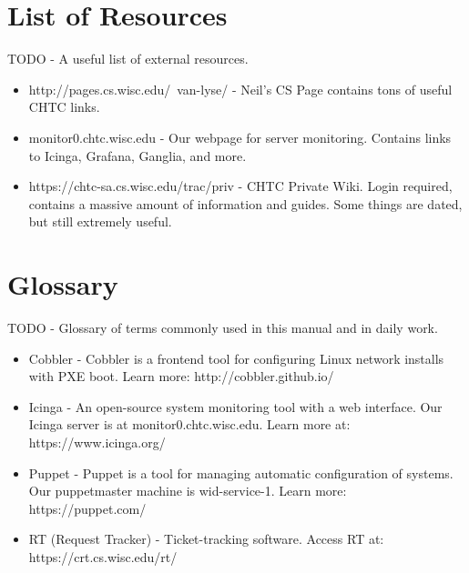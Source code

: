 \documentclass[10pt,letterpaper]{article}
\begin{document}
\clearpage

\section{List of Resources}
    TODO - A useful list of external resources.
    \begin{itemize}
        \item http://pages.cs.wisc.edu/~van-lyse/ - Neil's CS Page contains tons
        of useful CHTC links.
        \item monitor0.chtc.wisc.edu - Our webpage for server monitoring. Contains
        links to Icinga, Grafana, Ganglia, and more.
        \item https://chtc-sa.cs.wisc.edu/trac/priv - CHTC Private Wiki. Login required,
        contains a massive amount of information and guides. Some things are dated, but
        still extremely useful.
    \end{itemize}
\clearpage

\section{Glossary}
    TODO - Glossary of terms commonly used in this manual and in daily work.
    \begin{itemize}
        \item Cobbler - Cobbler is a frontend tool for configuring Linux network
        installs with PXE boot. Learn more: http://cobbler.github.io/
        \item Icinga - An open-source system monitoring tool with a web interface.
        Our Icinga server is at monitor0.chtc.wisc.edu. Learn more at: https://www.icinga.org/
        \item Puppet - Puppet is a tool for managing automatic configuration of
        systems. Our puppetmaster machine is wid-service-1. Learn more:
        https://puppet.com/
        \item RT (Request Tracker) - Ticket-tracking software. Access RT at:
        https://crt.cs.wisc.edu/rt/
    \end{itemize}
\clearpage
\end{document}
